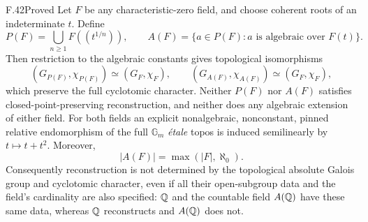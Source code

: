 \begin{claim}{F.42}{Proved}
Let $F$ be any characteristic-zero field, and choose coherent
roots of an indeterminate $t$. Define
\[
 P(F)=\bigcup_{n\ge1}F((t^{1/n})),\qquad
 A(F)=\{a\in P(F):a\text{ is algebraic over }F(t)\}.
\]
Then restriction to the algebraic constants gives topological
isomorphisms
\[
 (G_{P(F)},\chi_{P(F)})\simeq(G_F,\chi_F),\qquad
 (G_{A(F)},\chi_{A(F)})\simeq(G_F,\chi_F),
\]
which preserve the full cyclotomic character. Neither $P(F)$
nor $A(F)$ satisfies closed-point-preserving reconstruction,
and neither does any algebraic extension of either field.
For both fields an explicit nonalgebraic, nonconstant, pinned
relative endomorphism of the full $\mathbb G_m$ \emph{\'etale}
topos is induced semilinearly by $t\mapsto t+t^2$.
Moreover,
\[
 |A(F)|=\max(|F|,\aleph_0).
\]
Consequently reconstruction is not determined by the topological
absolute Galois group and cyclotomic character, even if all their
open-subgroup data and the field's cardinality are also specified:
$\mathbb Q$ and the countable field $A(\mathbb Q)$ have these same data,
whereas $\mathbb Q$ reconstructs and $A(\mathbb Q)$ does not.
\end{claim}
